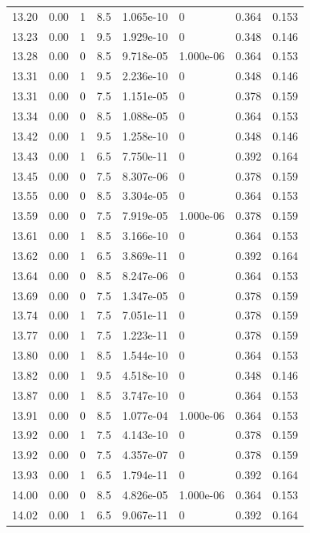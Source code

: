 \documentclass[preview]{standalone}
\begin{document}
{{{{{{{{{{\begin{tabular}{L{1.2cm}C{1.2cm} C{0.3cm}C{0.5cm} C{1.4cm}C{1.4cm} C{1.4cm}C{1.4cm}}
  13.20  &  0.00  & 1     & 8.5 &  1.065e-10  & 0  & 0.364 &  0.153   \\ 
  13.23  &  0.00  & 1     & 9.5 &  1.929e-10  & 0  & 0.348 &  0.146   \\ 
  13.28  &  0.00  & 0     & 8.5 &  9.718e-05  & 1.000e-06  & 0.364 &  0.153   \\ 
  13.31  &  0.00  & 1     & 9.5 &  2.236e-10  & 0  & 0.348 &  0.146   \\ 
  13.31  &  0.00  & 0     & 7.5 &  1.151e-05  & 0  & 0.378 &  0.159   \\ 
  13.34  &  0.00  & 0     & 8.5 &  1.088e-05  & 0  & 0.364 &  0.153   \\ 
  13.42  &  0.00  & 1     & 9.5 &  1.258e-10  & 0  & 0.348 &  0.146   \\ 
  13.43  &  0.00  & 1     & 6.5 &  7.750e-11  & 0  & 0.392 &  0.164   \\ 
  13.45  &  0.00  & 0     & 7.5 &  8.307e-06  & 0  & 0.378 &  0.159   \\ 
  13.55  &  0.00  & 0     & 8.5 &  3.304e-05  & 0  & 0.364 &  0.153   \\ 
  13.59  &  0.00  & 0     & 7.5 &  7.919e-05  & 1.000e-06  & 0.378 &  0.159   \\ 
  13.61  &  0.00  & 1     & 8.5 &  3.166e-10  & 0  & 0.364 &  0.153   \\ 
  13.62  &  0.00  & 1     & 6.5 &  3.869e-11  & 0  & 0.392 &  0.164   \\ 
  13.64  &  0.00  & 0     & 8.5 &  8.247e-06  & 0  & 0.364 &  0.153   \\ 
  13.69  &  0.00  & 0     & 7.5 &  1.347e-05  & 0  & 0.378 &  0.159   \\ 
  13.74  &  0.00  & 1     & 7.5 &  7.051e-11  & 0  & 0.378 &  0.159   \\ 
  13.77  &  0.00  & 1     & 7.5 &  1.223e-11  & 0  & 0.378 &  0.159   \\ 
  13.80  &  0.00  & 1     & 8.5 &  1.544e-10  & 0  & 0.364 &  0.153   \\ 
  13.82  &  0.00  & 1     & 9.5 &  4.518e-10  & 0  & 0.348 &  0.146   \\ 
  13.87  &  0.00  & 1     & 8.5 &  3.747e-10  & 0  & 0.364 &  0.153   \\ 
  13.91  &  0.00  & 0     & 8.5 &  1.077e-04  & 1.000e-06  & 0.364 &  0.153   \\ 
  13.92  &  0.00  & 1     & 7.5 &  4.143e-10  & 0  & 0.378 &  0.159   \\ 
  13.92  &  0.00  & 0     & 7.5 &  4.357e-07  & 0  & 0.378 &  0.159   \\ 
  13.93  &  0.00  & 1     & 6.5 &  1.794e-11  & 0  & 0.392 &  0.164   \\ 
  14.00  &  0.00  & 0     & 8.5 &  4.826e-05  & 1.000e-06  & 0.364 &  0.153   \\ 
  14.02  &  0.00  & 1     & 6.5 &  9.067e-11  & 0  & 0.392 &  0.164   \\ 
\hline 
\end{tabular} 

}}}}}}}}}}
\end{document}
